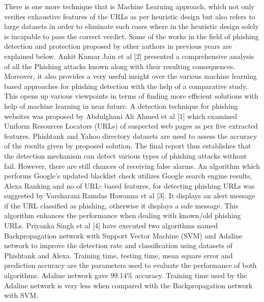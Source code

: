 \documentclass[12pt]{article}
\begin{document}
\noindent There is one more technique that is Machine Learning approach, which not only verifies exhaustive features of the URLs as per heuristic design but also refers to large datasets in order to eliminate such cases where in the heuristic design solely is incapable to pass the correct verdict. Some of the works in the field of phishing detection and protection proposed by other authors in previous years are explained below.\newline\newline
Ankit Kumar Jain et al [2] presented a comprehensive analysis of all the Phishing attacks known along with their resulting consequences. Moreover, it also provides a very useful insight over the various machine learning based approaches for phishing detection with the help of a comparative study. This opens up various viewpoints in terms of finding more efficient solutions with help of machine learning in near future.\newline\newline
A detection technique for phishing websites was proposed by Abdulghani Ali Ahmed et al [1] which examined Uniform Resources Locators (URLs) of suspected web pages as per five extracted features. Phishtank and Yahoo directory datasets are used to assess the accuracy of the results given by proposed solution. The final report thus establishes that the detection mechanism can detect various types of phishing attacks without fail. However, there are still chances of receiving false alarms.\newline\newline
An algorithm which performs Google’s updated blacklist check utilizes Google search engine results, Alexa Ranking and no of URL- based features, for detecting phishing URLs was suggested by Varsharani Ramdas Hawanna et al [3]. It displays an alert message if the URL classified as phishing, otherwise it displays a safe message. This algorithm enhances the performance when dealing with known/old phishing URLs.\newline\newline
Priyanka Singh et al [4] have executed two algorithms named Backpropagation network with Support Vector Machine (SVM) and Adaline network to improve the detection rate and classification using datasets of Phishtank and Alexa. Training time, testing time, mean square error and prediction accuracy are the parameters used to evaluate the performance of both algorithms. Adaline network gave 99.14\% accuracy. Training time used by the Adaline network is very less when compared with the Backpropagation network with SVM.
\end{document}
